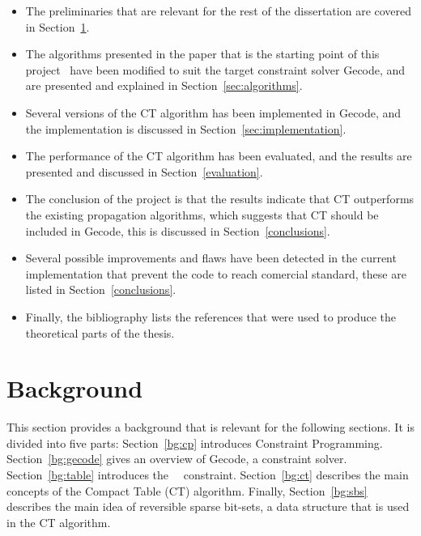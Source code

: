 \documentclass[a4paper,11pt]{article}
\newcommand{\Secref}[1]{Section~\ref{#1}}
\newcommand{\Table}{\Constraint{Table}~}
\numberwithin{equation}{section}
\begin{document}
\begin{itemize}
  \item The preliminaries that are relevant for the rest of the dissertation
    are covered in \Secref{bg}.

  \item The algorithms presented in the paper that is the starting point of this 
    project~\cite{DBLP:conf/cp/DemeulenaereHLP16} 
    have been modified to suit the target constraint solver Gecode, and are presented and explained in 
    \Secref{sec:algorithms}.

  \item Several versions of the CT algorithm has been implemented in Gecode, and
    the implementation is discussed in \Secref{sec:implementation}.

  \item The performance of the CT algorithm has been evaluated,
    and the results
    are presented and discussed in \Secref{evaluation}.

  \item The conclusion of the project is that the results indicate
    that CT outperforms the existing propagation algorithms, which
    suggests that CT should be included in Gecode, this is discussed
    in \Secref{conclusions}.

  \item Several possible improvements and flaws have been detected in the current
    implementation that prevent the code to reach comercial standard, these
    are listed in \Secref{conclusions}.
    
  \item Finally, the bibliography lists the references that were used to
    produce the theoretical parts of the thesis.
    
\end{itemize}

\section{Background}
\label{bg}


This section provides a background that is relevant for the
following sections. It is divided into five parts: \Secref{bg:cp}
introduces Constraint Programming. \Secref{bg:gecode} gives an overview
of Gecode, a constraint solver. \Secref{bg:table} introduces the~\Table
constraint. \Secref{bg:ct} describes the main concepts of the Compact
Table (CT) algorithm. Finally, \Secref{bg:sbs} describes the main
idea of reversible sparse bit-sets,
a data structure that is used in the CT algorithm.
\end{document}

